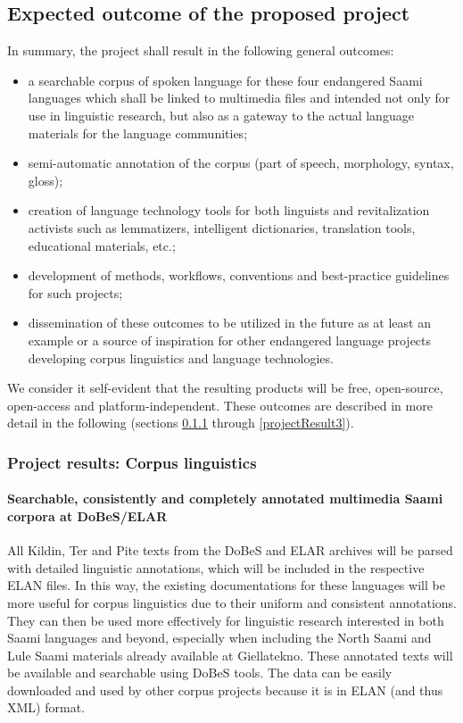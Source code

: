 \documentclass[a4paper,12pt]{article}
\begin{document}
\subsection{Expected outcome of the proposed project}
In summary, the project shall result in the following general outcomes:
\begin{itemize}
\item a searchable corpus of spoken language for these four endangered Saami languages which shall be linked to multimedia files and intended not only for use in linguistic research, but also as a gateway to the actual language materials for the language communities;
\item semi-automatic annotation of the corpus (part of speech, morphology, syntax, gloss);
\item creation of language technology tools for both linguists and revitalization activists such as lemmatizers, intelligent dictionaries, translation tools, educational materials, etc.; 
\item development of methods, workflows, conventions and best-practice guidelines for such projects;
\item dissemination of these outcomes to be utilized in the future as at least an example or a source of inspiration for other endangered language projects developing corpus linguistics and language technologies.
\end{itemize}
We consider it self-evident that the resulting products will be free, open-source, open-access and platform-independent. These outcomes are described in more detail in the following (sections \ref{projectResult1} through \ref{projectResult3}).

\subsubsection{Project results: Corpus linguistics}\label{projectResult1}
\paragraph{Searchable, consistently and completely annotated multimedia Saami corpora at DoBeS/ELAR}
All Kildin, Ter and Pite texts from the DoBeS and ELAR archives will be parsed with detailed linguistic annotations, which will be included in the respective ELAN files. In this way, the existing documentations for these languages will be more useful for corpus linguistics due to their uniform and consistent annotations. They can then be used more effectively for linguistic research interested in both Saami languages and beyond, especially when including the North Saami and Lule Saami materials already available at Giellatekno. These annotated texts will be available and searchable using DoBeS tools. The data can be easily downloaded and used by other corpus projects because it is in ELAN (and thus XML) format.
\end{document}

